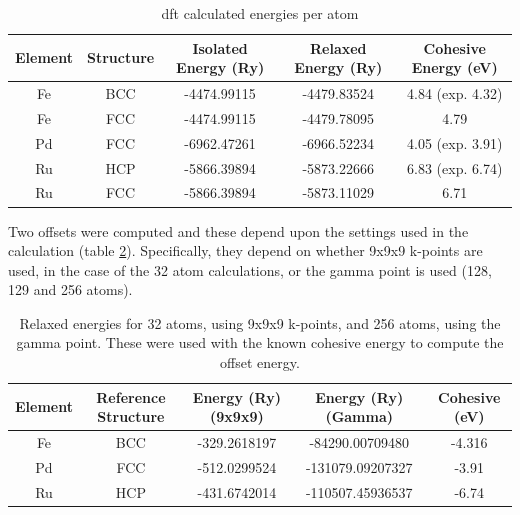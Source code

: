 \begin{table}[h]
\begin{center}
\begin{tabular}{c c c c c}
\hline\hline
Element & Structure & Isolated Energy (Ry) & Relaxed Energy (Ry) & Cohesive Energy (eV) \\
\hline\hline
Fe      & BCC       & -4474.99115          & -4479.83524         & 4.84 (exp. 4.32)\\
Fe      & FCC       & -4474.99115          & -4479.78095         & 4.79 \\
Pd      & FCC       & -6962.47261          & -6966.52234         & 4.05 (exp. 3.91)\\
Ru      & HCP       & -5866.39894          & -5873.22666         & 6.83 (exp. 6.74)\\
Ru      & FCC       & -5866.39894          & -5873.11029         & 6.71 \\
\hline\hline
\end{tabular}
\end{center}
\caption{\acrshort{dft} calculated energies per atom}
\label{table:calculatedcohesiveenergies}
\end{table}

Two offsets were computed and these depend upon the settings used in the calculation (table \ref{table:calculatedoffset}).  Specifically, they depend on whether 9x9x9 k-points are used, in the case of the 32 atom calculations, or the gamma point is used (128, 129 and 256 atoms).

\begin{table}[h]
\begin{center}
\begin{tabular}{c c c c c}
\hline\hline
Element & Reference Structure & Energy (Ry) (9x9x9) & Energy (Ry) (Gamma) & Cohesive (eV)\\
\hline\hline
Fe      & BCC  & -329.2618197  & -84290.00709480 & -4.316 \\
Pd      & FCC  & -512.0299524  & -131079.09207327 & -3.91 \\
Ru      & HCP  & -431.6742014  & -110507.45936537 & -6.74 \\
\hline\hline
\end{tabular}
\end{center}
\caption{Relaxed energies for 32 atoms, using 9x9x9 k-points, and 256 atoms, using the gamma point.  These were used with the known cohesive energy to compute the offset energy.}
\label{table:calculatedoffset}
\end{table}



